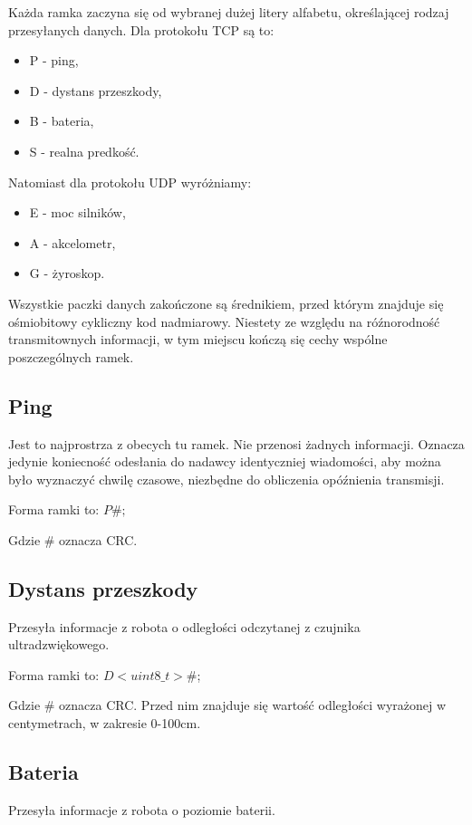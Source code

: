 \documentclass[10pt, a4paper]{article}
\begin{document}
Każda ramka zaczyna się od wybranej dużej litery alfabetu, określającej rodzaj 
przesyłanych danych. Dla protokołu TCP są to:

	\begin{itemize}
	  \item P - ping,
	  \item D - dystans przeszkody,
	  \item B - bateria,
	  \item S - realna predkość.
	\end{itemize}
	
Natomiast dla protokołu UDP wyróżniamy:
  \begin{itemize}
	\item E - moc silników,
	\item A - akcelometr,
	\item G - żyroskop.
  \end{itemize}

Wszystkie paczki danych zakończone są średnikiem, przed którym znajduje się
ośmiobitowy cykliczny kod nadmiarowy. Niestety ze względu na róźnorodność 
transmitownych informacji, w tym miejscu kończą się cechy wspólne poszczególnych 
ramek.

\subsection{Ping}
Jest to najprostrza z obecych tu ramek. Nie przenosi żadnych informacji.
Oznacza jedynie koniecność odesłania do nadawcy identyczniej wiadomości,
aby można było wyznaczyć chwilę czasowe, niezbędne do obliczenia opóźnienia
transmisji.

Forma ramki to: $P\#;$

Gdzie \# oznacza CRC.



\subsection{Dystans przeszkody}
Przesyła informacje z robota o odległości odczytanej z czujnika ultradzwiękowego.

Forma ramki to: $D<uint8\_t>\#$;
\newline

Gdzie \# oznacza CRC. Przed nim znajduje się wartość odległości wyrażonej 
w centymetrach, w zakresie 0-100cm.



\subsection{Bateria}
Przesyła informacje z robota o poziomie baterii.
\end{document}
